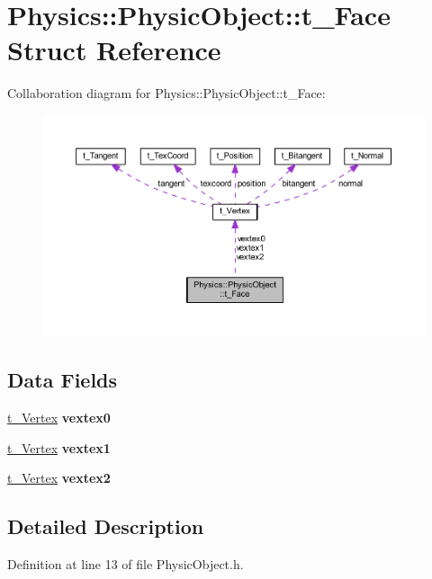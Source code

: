 \hypertarget{struct_physics_1_1_physic_object_1_1t___face}{}\section{Physics\+:\+:Physic\+Object\+:\+:t\+\_\+\+Face Struct Reference}
\label{struct_physics_1_1_physic_object_1_1t___face}


Collaboration diagram for Physics\+:\+:Physic\+Object\+:\+:t\+\_\+\+Face\+:
\nopagebreak
\begin{figure}[H]
\begin{center}
\leavevmode
\includegraphics[width=350pt]{struct_physics_1_1_physic_object_1_1t___face__coll__graph}
\end{center}
\end{figure}
\subsection*{Data Fields}
\begin{DoxyCompactItemize}
\item 
\hyperlink{structt___vertex}{t\+\_\+\+Vertex} {\bfseries vextex0}\hypertarget{struct_physics_1_1_physic_object_1_1t___face_a3b67d388f1057265901338a0a2c5b285}{}\label{struct_physics_1_1_physic_object_1_1t___face_a3b67d388f1057265901338a0a2c5b285}

\item 
\hyperlink{structt___vertex}{t\+\_\+\+Vertex} {\bfseries vextex1}\hypertarget{struct_physics_1_1_physic_object_1_1t___face_a201e83bef60c2f0a4ee2093364d2ff95}{}\label{struct_physics_1_1_physic_object_1_1t___face_a201e83bef60c2f0a4ee2093364d2ff95}

\item 
\hyperlink{structt___vertex}{t\+\_\+\+Vertex} {\bfseries vextex2}\hypertarget{struct_physics_1_1_physic_object_1_1t___face_a75749e11e95c6ba62739ad3d6663c23b}{}\label{struct_physics_1_1_physic_object_1_1t___face_a75749e11e95c6ba62739ad3d6663c23b}

\end{DoxyCompactItemize}


\subsection{Detailed Description}


Definition at line 13 of file Physic\+Object.\+h.

